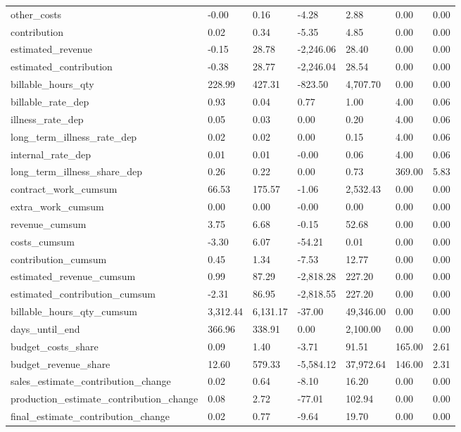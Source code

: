 \begin{landscape}
\begin{longtable}[h!]{lllllll}
other_costs & -0.00 & 0.16 & -4.28 & 2.88 & 0.00 & 0.00 \\
contribution & 0.02 & 0.34 & -5.35 & 4.85 & 0.00 & 0.00 \\
estimated_revenue & -0.15 & 28.78 & -2,246.06 & 28.40 & 0.00 & 0.00 \\
estimated_contribution & -0.38 & 28.77 & -2,246.04 & 28.54 & 0.00 & 0.00 \\
billable_hours_qty & 228.99 & 427.31 & -823.50 & 4,707.70 & 0.00 & 0.00 \\
billable_rate_dep & 0.93 & 0.04 & 0.77 & 1.00 & 4.00 & 0.06 \\
illness_rate_dep & 0.05 & 0.03 & 0.00 & 0.20 & 4.00 & 0.06 \\
long_term_illness_rate_dep & 0.02 & 0.02 & 0.00 & 0.15 & 4.00 & 0.06 \\
internal_rate_dep & 0.01 & 0.01 & -0.00 & 0.06 & 4.00 & 0.06 \\
long_term_illness_share_dep & 0.26 & 0.22 & 0.00 & 0.73 & 369.00 & 5.83 \\
contract_work_cumsum & 66.53 & 175.57 & -1.06 & 2,532.43 & 0.00 & 0.00 \\
extra_work_cumsum & 0.00 & 0.00 & -0.00 & 0.00 & 0.00 & 0.00 \\
revenue_cumsum & 3.75 & 6.68 & -0.15 & 52.68 & 0.00 & 0.00 \\
costs_cumsum & -3.30 & 6.07 & -54.21 & 0.01 & 0.00 & 0.00 \\
contribution_cumsum & 0.45 & 1.34 & -7.53 & 12.77 & 0.00 & 0.00 \\
estimated_revenue_cumsum & 0.99 & 87.29 & -2,818.28 & 227.20 & 0.00 & 0.00 \\
estimated_contribution_cumsum & -2.31 & 86.95 & -2,818.55 & 227.20 & 0.00 & 0.00 \\
billable_hours_qty_cumsum & 3,312.44 & 6,131.17 & -37.00 & 49,346.00 & 0.00 & 0.00 \\
days_until_end & 366.96 & 338.91 & 0.00 & 2,100.00 & 0.00 & 0.00 \\
budget_costs_share & 0.09 & 1.40 & -3.71 & 91.51 & 165.00 & 2.61 \\
budget_revenue_share & 12.60 & 579.33 & -5,584.12 & 37,972.64 & 146.00 & 2.31 \\
sales_estimate_contribution_change & 0.02 & 0.64 & -8.10 & 16.20 & 0.00 & 0.00 \\
production_estimate_contribution_change & 0.08 & 2.72 & -77.01 & 102.94 & 0.00 & 0.00 \\
final_estimate_contribution_change & 0.02 & 0.77 & -9.64 & 19.70 & 0.00 & 0.00 \\

\end{longtable}
\end{landscape}
